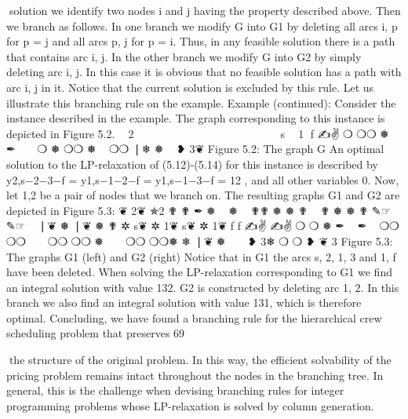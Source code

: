 solution we identify two nodes i and j having the property described above. Then we branch as follows.
In one branch we modify G into G1 by deleting all arcs {i, p} for p = j and all arcs {p, j} for p = i. Thus,
in any feasible solution there is a path that contains arc {i, j}. In the other branch we modify G into G2
by simply deleting arc {i, j}. In this case it is obvious that no feasible solution has a path with arc {i, j}
in it. Notice that the current solution is excluded by this rule. Let us illustrate this branching rule on
the example.
Example (continued): Consider the instance described in the example. The graph corresponding to
this instance is depicted in Figure 5.2.
❦
✯2
✟✟
✒
 
❅
✟✟  
❅
✟
 
❅
✟✟ ✎☞
✟
 
❘ ❦
❅
✲
s❦ ✲ 1❦
f
✍✌
❍
❍❍
❅
✒
 
 
❍
❅
❍❍ ❅
 
❍❍
❘❄
❅
 
❥
3❦
Figure 5.2: The graph G
An optimal solution to the LP-relaxation of (5.12)-(5.14) for this instance is described by y2,s−2−3−f =
y1,s−1−2−f = y1,s−1−3−f = 12 , and all other variables 0. Now, let 1,2 be a pair of nodes that we branch
on. The resulting graphs G1 and G2 are depicted in Figure 5.3:
❦
2❦
✯2
✟
✟
✒ ❅
 
❅
 
✟✟
❅
❅
✟
 
✟
❅
❅
✟
✎☞
✎☞
 
❘❦
❅
❘❦
❅
✟
✲
s❦ ✲ 1❦
s❦ ✲ 1❦
f
f
✍✌
✍✌
❍
❍
❅
✒
 
✒
 
❍❍
❍❍
 
 
❍❍
❍❍ ❅
 
 
❍❍
❍❍❅
❄
❘❦
❅
 
 
❥ 3❄
❍
❍
❥
❦
3
Figure 5.3: The graphs G1 (left) and G2 (right)
Notice that in G1 the arcs {s, 2}, {1, 3} and {1, f } have been deleted. When solving the LP-relaxation
corresponding to G1 we find an integral solution with value 132. G2 is constructed by deleting arc {1, 2}.
In this branch we also find an integral solution with value 131, which is therefore optimal.
Concluding, we have found a branching rule for the hierarchical crew scheduling problem that preserves
69

the structure of the original problem. In this way, the efficient solvability of the pricing problem remains
intact throughout the nodes in the branching tree. In general, this is the challenge when devising
branching rules for integer programming problems whose LP-relaxation is solved by column generation.


